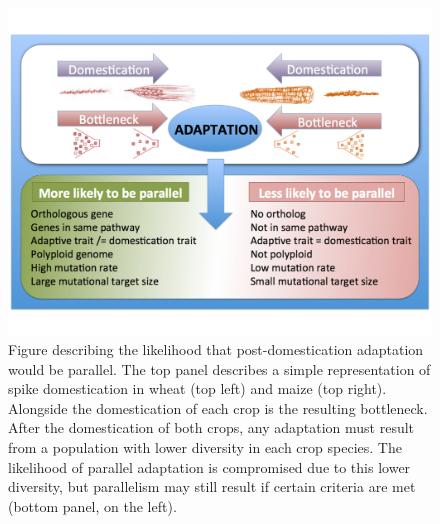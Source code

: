 \documentclass[12pt]{article}
\begin{document}
\begin{figure}[h]
    \centering
    \includegraphics[width=15cm]{parallel_adaptation.pdf}
    \caption{Figure describing the likelihood that post-domestication adaptation would be parallel. The top panel describes a simple representation of spike domestication in wheat (top left) and maize (top right). Alongside the domestication of each crop is the resulting bottleneck. After the domestication of both crops, any adaptation must result from a population with lower diversity in each crop species. The likelihood of parallel adaptation is compromised due to this lower diversity, but parallelism may still result if certain criteria are met (bottom panel, on the left). 
}
    \label{fig:adaptation}
\end{figure}
\end{document}
